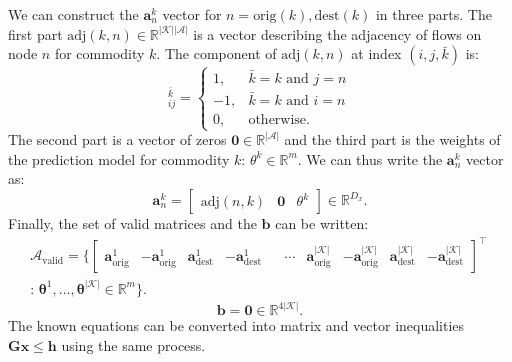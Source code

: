 We can construct the $\bm{a}^k_n$ vector for $n = \text{orig}(k), \text{dest}(k)$ in three parts. 
The first part $\text{adj}(k, n) \in \mathbb{R}^{|\mathcal{K}||\mathcal{A}|}$ is a vector describing the adjacency of flows on node $n$ for commodity $k$. 
The component of $\text{adj}(k, n)$ at index $(i,j,\bar{k})$ is:
\begin{equation}
    [\text{adj}(n, k)]^{\bar{k}}_{ij} = \begin{cases}
        1, & \bar{k}=k \text{ and } j=n\\
        -1, & \bar{k}=k \text{ and } i=n\\
        0,  & \text{otherwise}.
    \end{cases}
\end{equation}
The second part is a vector of zeros $\bm{0} \in \mathbb{R}^{|\mathcal{A}|}$ and the third part is the weights of the prediction model for commodity $k$: $\theta^k \in \mathbb{R}^m$. We can thus write the $\bm{a}^k_n$ vector as:
\begin{equation}
    \bm{a}^k_n = \begin{bmatrix}
        \text{adj}(n, k) & \bm{0} & \theta^k  
    \end{bmatrix} \in \mathbb{R}^{D_x}.
\end{equation}
Finally, the set of valid matrices and the $\bm{b}$ can be written:
\begin{equation}\begin{split}
    \bm{\mathcal{A}}_{\text{valid}} = \biggl\{
    \begin{bmatrix}
        \bm{a}^1_{\text{orig}} & -\bm{a}^1_{\text{orig}} &
        \bm{a}^1_{\text{dest}} & -\bm{a}^1_{\text{dest}} &
        & \cdots & 
        \bm{a}^{|\mathcal{K}|}_{\text{orig}} & -\bm{a}^{|\mathcal{K}|}_{\text{orig}} &
        \bm{a}^{|\mathcal{K}|}_{\text{dest}} & -\bm{a}^{|\mathcal{K}|}_{\text{dest}} 
    \end{bmatrix}^\top \, \\:\,
    \bm{\theta}^1, \ldots, \bm{\theta}^{|\mathcal{K}|} \in \mathbb{R}^m\biggr\}.
\end{split}\end{equation}
\begin{equation}
    \bm{b} = \bm{0} \in \mathbb{R}^{4|\mathcal{K}|}.
\end{equation}
The known equations can be converted into matrix and vector inequalities $\bm{Gx} \leq \bm{h}$ using the same process. 

